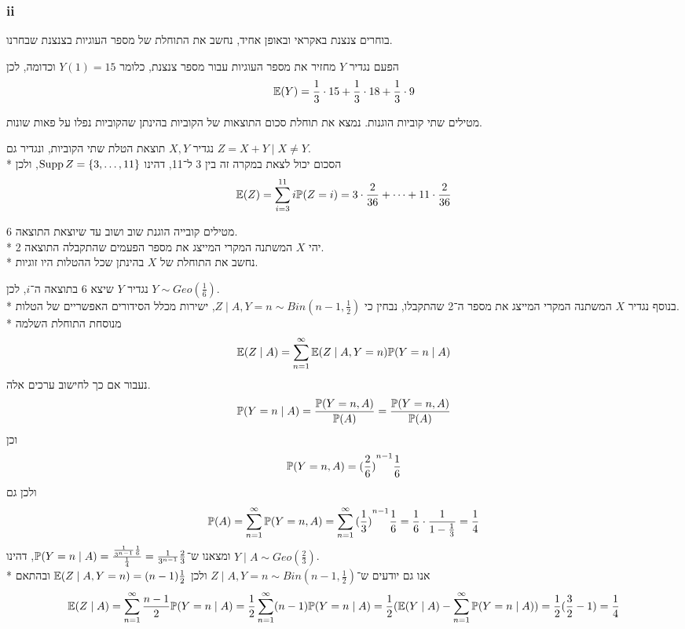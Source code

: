 \subsubsection{ii}
בוחרים צנצנת באקראי ובאופן אחיד, נחשב את התוחלת של מספר העוגיות בצנצנת שבחרנו.
\begin{solution}
	הפעם נגדיר $Y$ מחזיר את מספר העוגיות עבור מספר צנצנת, כלומר $Y(1) = 15$ וכדומה, לכן
	\[
		\mathbb{E}(Y) = \frac{1}{3} \cdot 15 + \frac{1}{3} \cdot 18 + \frac{1}{3} \cdot 9
	\]
\end{solution}

\subquestion{}
מטילים שתי קוביות הוגנות.
נמצא את תוחלת סכום התוצאות של הקוביות בהינתן שהקוביות נפלו על פאות שונות.
\begin{solution}
	נגדיר $X, Y$ תוצאת הטלת שתי הקוביות, ונגדיר גם $Z = X + Y \mid X \ne Y$. \\*
	הסכום יכול לצאת במקרה זה בין 3 ל־11, דהינו $\operatorname{Supp} Z = \{3, \dots, 11\}$, ולכן
	\[
		\mathbb{E}(Z)
		= \sum_{i = 3}^{11} i \mathbb{P}(Z = i)
		= 3 \cdot \frac{2}{36} + \cdots + 11 \cdot \frac{2}{36}
	\]
\end{solution}

\subquestion{}
מטילים קובייה הוגנת שוב ושוב עד שיוצאת התוצאה 6. \\*
יהי $X$ המשתנה המקרי המייצג את מספר הפעמים שהתקבלה התוצאה 2. \\*
נחשב את התוחלת של $X$ בהינתן שכל ההטלות היו זוגיות.
\begin{solution}
	נגדיר $Y$ שיצא 6 בתוצאה ה־$i$, לכן $Y \sim Geo(\frac{1}{6})$. \\*
	בנוסף נגדיר $X$ המשתנה המקרי המייצג את מספר ה־2 שהתקבלו, נבחין כי $Z \mid A, Y = n \sim Bin(n - 1, \frac{1}{2})$, ישירות מכלל הסידורים האפשריים של הטלות. \\*
	מנוסחת התוחלת השלמה
	\[
		\mathbb{E}(Z \mid A)
		= \sum_{n = 1}^{\infty} \mathbb{E}(Z \mid A, Y = n) \mathbb{P}(Y = n \mid A)
	\]
	נעבור אם כך לחישוב ערכים אלה.
	\[
		\mathbb{P}(Y = n \mid A)
		= \frac{\mathbb{P}(Y = n, A)}{\mathbb{P}(A)}
		= \frac{\mathbb{P}(Y = n, A)}{\mathbb{P}(A)}
	\]
	וכן
	\[
		\mathbb{P}(Y = n, A)
		= {(\frac{2}{6})}^{n - 1} \frac{1}{6}
	\]
	ולכן גם
	\[
		\mathbb{P}(A)
		= \sum_{n = 1}^{\infty} \mathbb{P}(Y = n, A)
		= \sum_{n = 1}^{\infty} {(\frac{1}{3})}^{n - 1} \frac{1}{6}
		= \frac{1}{6} \cdot \frac{1}{1 - \frac{1}{3}}
		= \frac{1}{4}
	\]
	ומצאנו ש־$\mathbb{P}(Y = n \mid A) = \frac{\frac{1}{3^{n - 1}} \frac{1}{6}}{\frac{1}{4}} = \frac{1}{3^{n - 1}} \frac{2}{3}$, דהינו $Y \mid A \sim Geo(\frac{2}{3})$. \\*
	אנו גם יודעים ש־$Z \mid A, Y = n \sim Bin(n - 1, \frac{1}{2})$ ולכן $\mathbb{E}(Z \mid A, Y = n) = (n - 1) \frac{1}{2}$ ובהתאם
	\[
		\mathbb{E}(Z \mid A)
		= \sum_{n = 1}^{\infty} \frac{n - 1}{2} \mathbb{P}(Y = n \mid A)
		= \frac{1}{2} \sum_{n = 1}^{\infty} (n - 1) \mathbb{P}(Y = n \mid A)
		= \frac{1}{2} (\mathbb{E}(Y \mid A) - \sum_{n = 1}^{\infty} \mathbb{P}(Y = n \mid A))
		= \frac{1}{2} (\frac{3}{2} - 1)
		= \frac{1}{4}
	\]
\end{solution}

